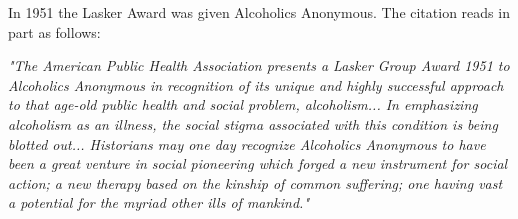


\bbChapterPreamble




\begin{biblechapter}
\verse In 1951 the Lasker Award was given Alcoholics Anonymous.
\verse The citation reads in part as follows:


    \emph{"The American Public Health Association 
    presents a Lasker Group Award 1951 to Alcoholics Anonymous
    in recognition of its unique and highly successful approach 
    to that age-old public health and social problem,
    alcoholism...
\verse In emphasizing alcoholism as an illness,
    the social stigma associated with this condition is being
    blotted out...
\verse Historians may one day recognize Alcoholics Anonymous 
    to have been a great venture in social pioneering 
    which forged a new instrument for social action; 
    a new therapy based on the kinship of common suffering; 
    one having vast a potential for the myriad other ills of mankind."
}
\end{biblechapter}
